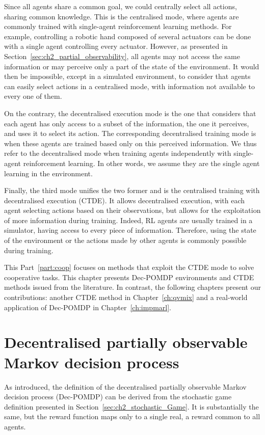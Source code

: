Since all agents share a common goal, we could centrally select all actions, sharing common knowledge.
This is the centralised mode, where agents are commonly trained with single-agent reinforcement learning methods.
For example, controlling a robotic hand composed of several actuators can be done with a single agent controlling every actuator.
However, as presented in Section~\ref{sec:ch2_partial_observability}, all agents may not access the same information or may perceive only a part of the state of the environment.
It would then be impossible, except in a simulated environment, to consider that agents can easily select actions in a centralised mode, with information not available to every one of them.

On the contrary, the decentralised execution mode is the one that considers that each agent has only access to a subset of the information, the one it perceives, and uses it to select its action.
The corresponding decentralised training mode is when these agents are trained based only on this perceived information.
We thus refer to the decentralised mode when training agents independently with single-agent reinforcement learning.
In other words, we assume they are the single agent learning in the environment.

Finally, the third mode unifies the two former and is the centralised training with decentralised execution (CTDE).
It allows decentralised execution, with each agent selecting actions based on their observations, but allows for the exploitation of more information during training.
Indeed, RL agents are usually trained in a simulator, having access to every piece of information.
Therefore, using the state of the environment or the actions made by other agents is commonly possible during training.

This Part~\ref{part:coop} focuses on methods that exploit the CTDE mode to solve cooperative tasks.
This chapter presents Dec-POMDP environments and CTDE methods issued from the literature. 
In contrast, the following chapters present our contributions: another CTDE method in Chapter~\ref{ch:qvmix} and a real-world application of Dec-POMDP in Chapter~\ref{ch:impmarl}.


\section{Decentralised partially observable Markov decision process}
\label{sec:ch3_decpomdp}
As introduced, the definition of the decentralised partially observable Markov decision process (Dec-POMDP) \citep{DecPomdp} can be derived from the stochastic game definition presented in Section~\ref{sec:ch2_stochastic_Game}.
It is substantially the same, but the reward function maps only to a single real, a reward common to all agents.

